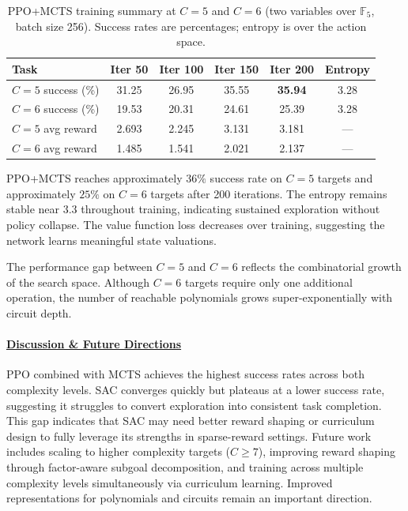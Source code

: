 \documentclass{article} %
\begin{document}
\begin{table}[h]
\centering
\caption{PPO+MCTS training summary at $C=5$ and $C=6$ (two variables over $\mathbb{F}_5$, batch size 256). Success rates are percentages; entropy is over the action space.}
\label{tab:ppo_summary}
\begin{tabular}{l c c c c c}
\toprule
Task & Iter 50 & Iter 100 & Iter 150 & Iter 200 & Entropy \\
\midrule
$C=5$ success (\%) & 31.25 & 26.95 & 35.55 & \textbf{35.94} & 3.28 \\
$C=6$ success (\%) & 19.53 & 20.31 & 24.61 & 25.39 & 3.28 \\
\midrule
$C=5$ avg reward   & 2.693 & 2.245 & 3.131 & 3.181 & --- \\
$C=6$ avg reward   & 1.485 & 1.541 & 2.021 & 2.137 & --- \\
\bottomrule
\end{tabular}
\end{table}

PPO+MCTS reaches approximately $36\%$ success rate on $C=5$ targets and approximately $25\%$ on $C=6$ targets after 200 iterations. The entropy remains stable near $3.3$ throughout training, indicating sustained exploration without policy collapse. The value function loss decreases over training, suggesting the network learns meaningful state valuations.

The performance gap between $C=5$ and $C=6$ reflects the combinatorial growth of the search space. Although $C=6$ targets require only one additional operation, the number of reachable polynomials grows super-exponentially with circuit depth.

\paragraph{\underline{Discussion \& Future Directions}}
PPO combined with MCTS achieves the highest success rates across both complexity levels. SAC converges quickly but plateaus at a lower success rate, suggesting it struggles to convert exploration into consistent task completion. This gap indicates that SAC may need better reward shaping or curriculum design to fully leverage its strengths in sparse-reward settings. Future work includes scaling to higher complexity targets ($C \geq 7$), improving reward shaping through factor-aware subgoal decomposition, and training across multiple complexity levels simultaneously via curriculum learning. Improved representations for polynomials and circuits remain an important direction.
\end{document}
